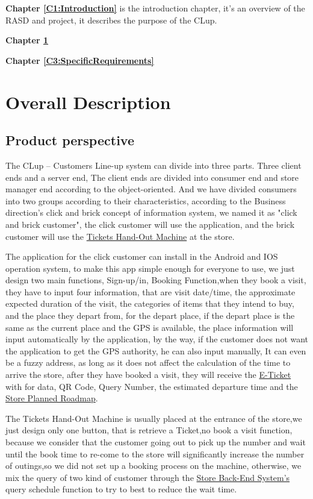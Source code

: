 \documentclass[a4paper,12pt]{book}
\begin{document}
\textbf{Chapter \ref{C1:Introduction}} is the introduction chapter, it's an overview of the RASD and project, 
it describes the purpose of the CLup.

\textbf{Chapter \ref{C2:OverallDescription}} 

\textbf{Chapter \ref{C3:SpecificRequirements}} 






\chapter{Overall Description} \label{C2:OverallDescription}
\section{Product perspective}

The CLup – Customers Line-up system can divide into three parts. Three client ends and a server end, The client ends are divided into consumer end and store manager end according to the object-oriented. And we have divided consumers into two groups according to their characteristics, according to the Business direction's click and brick concept of information system, we named it as "click and brick customer", the click customer will use the application, and the brick customer will use the \hyperref[Definitions]{Tickets Hand-Out Machine} at the store.

The application for the click customer can install in the Android and IOS operation system, to make this app simple enough for everyone to use, we just design two main functions, Sign-up/in, Booking Function,when they book a visit, they have to input four information, that are visit date/time, the approximate expected duration of the visit, the categories of items that they intend to buy, and the place they depart from, for the depart place, if the depart place is the same as the current place and the GPS is available, the place information will input automatically by the application, by the way, if the customer does not want the application to get the GPS authority, he can also input manually, It can even be a fuzzy address, as long as it does not affect the calculation of the time to arrive the store, after they have booked a visit, they will receive the \hyperref[Definitions]{E-Ticket} with for data, QR Code, Query Number, the estimated departure time and the \hyperref[Definitions]{Store Planned Roadmap}.

The Tickets Hand-Out Machine is usually placed at the entrance of the store,we just design only one button, that is retrieve a Ticket,no book a visit function, because we consider that the customer going out to pick up the number and wait until the book time to re-come to the store will significantly increase the number of outings,so we did not set up a booking process on the machine, otherwise, we mix the query of two kind of customer through the \hyperref[Definitions]{Store Back-End System's} query schedule function to try to best to reduce the wait time.
\end{document}
